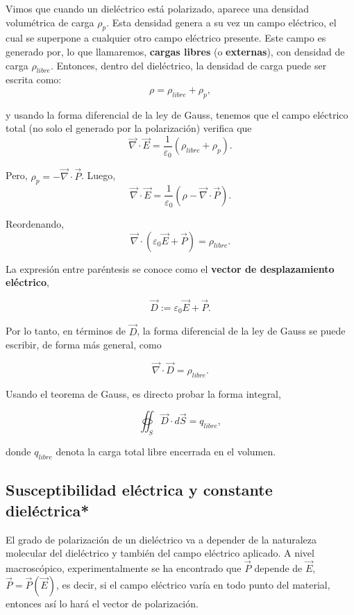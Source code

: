 Vimos que cuando un dieléctrico está polarizado, aparece una densidad volumétrica de carga $\rho_p$. Esta densidad genera a su vez un campo eléctrico, el cual se superpone a cualquier otro campo eléctrico presente. Este campo es generado por, lo que llamaremos, \textbf{cargas libres} (o \textbf{externas}), con densidad de carga $\rho_{libre}$. Entonces, dentro del dieléctrico, la densidad de carga puede ser escrita como:
$$\rho =  \rho_{libre} + \rho_p,$$

y usando la forma diferencial de la ley de Gauss, tenemos que el campo eléctrico total (no solo el generado por la polarización) verifica que 
$$\Vec{\nabla} \cdot \Vec{E} = \frac{1}{\varepsilon_0} (  \rho_{libre} + \rho_p).$$


Pero, $\rho_{p} = - \Vec{\nabla} \cdot \Vec{P}$. Luego,
$$\Vec{\nabla} \cdot \Vec{E} = \frac{1}{\varepsilon_0} (\rho - \Vec{\nabla} \cdot \vec{P}).$$

Reordenando,
$$\Vec{\nabla} \cdot ( \varepsilon_0 \Vec{E} + \Vec{P}) = \rho_{libre}.$$

La expresión entre paréntesis se conoce como el \textbf{vector de desplazamiento eléctrico},
\begin{shaded}
    $$\Vec{D} := \varepsilon_0 \Vec{E} + \Vec{P}.$$
\end{shaded}

Por lo tanto, en términos de $\Vec{D}$, la forma diferencial de la ley de Gauss se puede escribir, de forma más general, como
\begin{shaded}
    $$\Vec{\nabla} \cdot \Vec{D} = \rho_{libre}.$$
\end{shaded}

Usando el teorema de Gauss, es directo probar la forma integral,
\begin{shaded}
    $$\oiint_S \Vec{D} \cdot d\Vec{S} = q_{libre},$$
\end{shaded}

donde $q_{libre}$ denota la carga total libre encerrada en el volumen.

\subsection{Susceptibilidad eléctrica y constante dieléctrica*}

El grado de polarización de un dieléctrico va a depender de la naturaleza molecular del dieléctrico y también del campo eléctrico aplicado. A nivel macroscópico, experimentalmente se ha encontrado que $\Vec{P}$ depende de $\Vec{E}$, $\Vec{P} = \Vec{P}(\Vec{E})$, es decir, si el campo eléctrico varía en todo punto del material, entonces así lo hará el vector de polarización.


